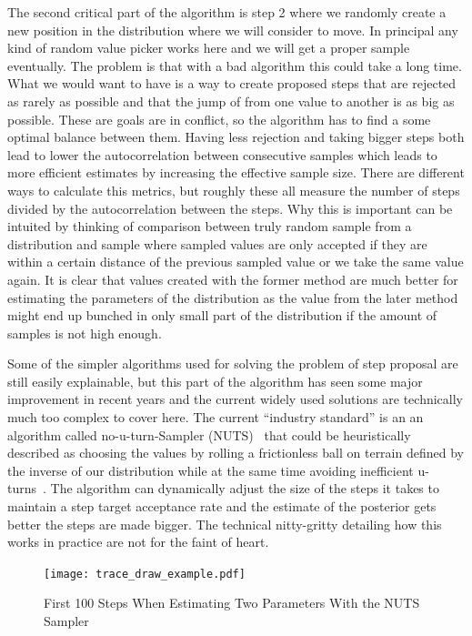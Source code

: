 \documentclass[12pt,a4paper,leqno]{report}
\theoremstyle{plain}
\theoremstyle{definition}
\theoremstyle{remark}
\begin{document}
The second critical part of the algorithm is step 2 where we randomly create a new
position in the distribution where we will consider to move. In principal any kind of
random value picker works here and we will get a proper sample eventually. The problem is
that with a bad algorithm this could take a long time. What we would want to have is a
way to create proposed steps that are rejected as rarely as possible and that the
jump of from one value to another is as big as possible. These are goals are in
conflict, so the algorithm has to find a some optimal balance between them.
Having less rejection and taking bigger steps both lead to lower the autocorrelation
between consecutive samples which leads to more efficient estimates by increasing the
effective sample size. There are different ways to calculate this metrics, but roughly
these all measure the number of steps divided by the autocorrelation between the steps.
Why this is important can be intuited by thinking of comparison between truly random sample from a distribution and
sample where sampled values are only accepted if they are within a certain distance of the
previous sampled value or we take the same value again. It is clear that values created
with the former method are much better for
estimating the parameters of the distribution as the value from the later method might
end up bunched in only small part of the distribution if the amount of samples is not
high enough.

Some of the simpler algorithms used for solving the problem of step proposal are still easily explainable, but
this part of the algorithm has seen some major improvement in recent years and the
current widely used solutions are technically much too complex to cover here. The
current ``industry standard'' is an an algorithm called no-u-turn-Sampler (NUTS)\ \cite{nuts}
that could be heuristically described as choosing the values by rolling a frictionless
ball on terrain defined by the inverse of our distribution while at the same time
avoiding inefficient u-turns\ \cite{kruschke}. The algorithm can dynamically adjust the
size of the steps it takes to maintain a step target acceptance rate and the estimate of
the posterior gets better the steps are made bigger. The technical nitty-gritty detailing how this works
in practice are not for the faint of heart.

\begin{figure}[H]
    \centering
    \caption{First 100 Steps When Estimating Two Parameters With the NUTS Sampler}\label{traceexample}
    \texttt{[image: trace\_draw\_example.pdf]}
\end{figure}
\end{document}
